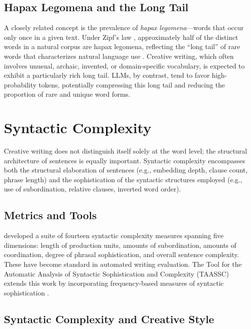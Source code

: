 \documentclass[12pt,a4paper]{article}
\begin{document}
\subsection{Hapax Legomena and the Long Tail}

A closely related concept is the prevalence of \emph{hapax legomena}---words that occur only once in a given text. Under Zipf's law \citep{zipf1949human}, approximately half of the distinct words in a natural corpus are hapax legomena, reflecting the ``long tail'' of rare words that characterizes natural language use \citep{williams2015zipf, popescu2020hapax}. Creative writing, which often involves unusual, archaic, invented, or domain-specific vocabulary, is expected to exhibit a particularly rich long tail. LLMs, by contrast, tend to favor high-probability tokens, potentially compressing this long tail and reducing the proportion of rare and unique word forms.

\section{Syntactic Complexity}

Creative writing does not distinguish itself solely at the word level; the structural architecture of sentences is equally important. Syntactic complexity encompasses both the structural elaboration of sentences (e.g., embedding depth, clause count, phrase length) and the sophistication of the syntactic structures employed (e.g., use of subordination, relative clauses, inverted word order).

\subsection{Metrics and Tools}

\citet{lu2010automatic} developed a suite of fourteen syntactic complexity measures spanning five dimensions: length of production units, amounts of subordination, amounts of coordination, degree of phrasal sophistication, and overall sentence complexity. These have become standard in automated writing evaluation. The Tool for the Automatic Analysis of Syntactic Sophistication and Complexity (TAASSC) extends this work by incorporating frequency-based measures of syntactic sophistication \citep{crossley2019taassc, kyle2016measuring}.

\subsection{Syntactic Complexity and Creative Style}
\end{document}
